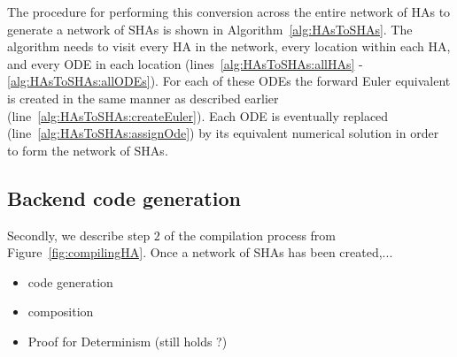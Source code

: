 The procedure for performing this conversion across the entire network of \acp{HA} to generate a network of \acp{SHA} is shown in Algorithm~\ref{alg:HAsToSHAs}.
The algorithm needs to visit every \ac{HA} in the network, every location within each \ac{HA}, and every \ac{ODE} in each location (lines~\ref{alg:HAsToSHAs:allHAs} - \ref{alg:HAsToSHAs:allODEs}).
For each of these \acp{ODE} the forward Euler equivalent is created in the same manner as described earlier (line~\ref{alg:HAsToSHAs:createEuler}).
Each \ac{ODE} is eventually replaced (line~\ref{alg:HAsToSHAs:assignOde}) by its equivalent numerical solution in order to form the network of \acp{SHA}.

\subsection{Backend code generation}
\label{sec:backendCodeGeneration}

Secondly, we describe step $2$ of the compilation process from Figure~\ref{fig:compilingHA}. Once a network of \acp{SHA} has been created,...

\begin{itemize}
	\item code generation
	\item composition
	\item Proof for Determinism (still holds ?)
\end{itemize}